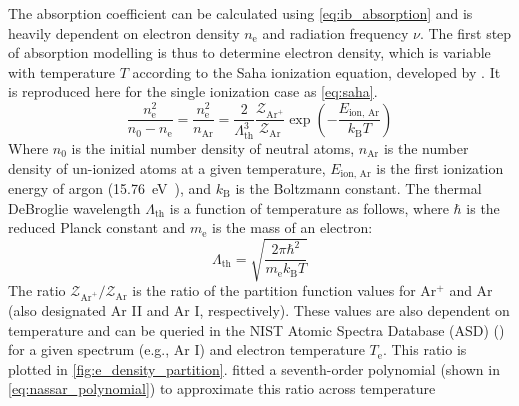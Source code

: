         The absorption coefficient can be calculated using \autoref{eq:ib_absorption} and is heavily dependent on electron density $n_\mathrm{e}$ and radiation frequency $\nu$. The first step of absorption modelling is thus to determine electron density, which is variable with temperature $T$ according to the Saha ionization equation, developed by \textcite{sahaPhysicalTheoryStellar1997}. It is reproduced here for the single ionization case as \autoref{eq:saha}.
        \begin{equation}
            \frac{n_\mathrm{e}^2}{n_0-n_\mathrm{e}} = \frac{n_\mathrm{e}^2}{n_\mathrm{Ar}} = \frac{2}{\Lambda_\mathrm{th}^3}\frac{\mathcal{Z}_{\mathrm{Ar}^+}}{\mathcal{Z}_\mathrm{Ar}}\exp{\left(-\frac{E_\text{ion, Ar}}{k_\mathrm{B}T}\right)}
            \label{eq:saha}
        \end{equation}
        Where $n_0$ is the initial number density of neutral atoms, $n_\mathrm{Ar}$ is the number density of un-ionized atoms at a given temperature, $E_\text{ion, Ar}$ is the first ionization energy of argon (\qty{15.76}{eV}~\cite{liasIonizationEnergyEvaluation2023}), and $k_\mathrm{B}$ is the Boltzmann constant. The thermal DeBroglie wavelength $\Lambda_\mathrm{th}$ is a function of temperature as follows, where $\hbar$ is the reduced Planck constant and $m_\mathrm{e}$ is the mass of an electron:
        \begin{equation*}
            \Lambda_\mathrm{th} = \sqrt{\frac{2\pi \hbar^2}{m_\mathrm{e}k_\mathrm{B}T}}
        \end{equation*}
        The ratio $\mathcal{Z}_{\mathrm{Ar}^+}/\mathcal{Z}_\mathrm{Ar}$ is the ratio of the partition function values for Ar$^+$ and Ar (also designated Ar II and Ar I, respectively). These values are also dependent on temperature and can be queried in the NIST Atomic Spectra Database (ASD) (\textcite{kramidaNISTAtomicSpectra2022}) for a given spectrum (e.g., Ar I) and electron temperature $T_\mathrm{e}$. This ratio is plotted in \autoref{fig:e_density_partition}. \citeauthor{nassarInvestigationLasersustainedPlasma2012} fitted a seventh-order polynomial (shown in \autoref{eq:nassar_polynomial}) to approximate this ratio across temperature

